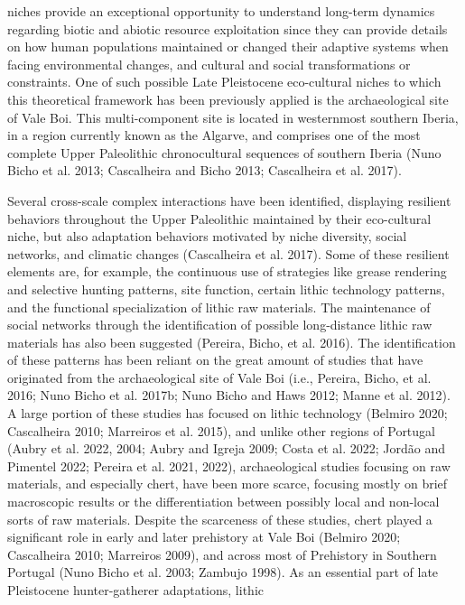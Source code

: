 \documentclass[
  a4paper,
  DIV=11,
  numbers=noendperiod]{scrreprt}
\begin{document}
niches provide an exceptional opportunity to understand long-term
dynamics regarding biotic and abiotic resource exploitation since they
can provide details on how human populations maintained or changed their
adaptive systems when facing environmental changes, and cultural and
social transformations or constraints. One of such possible Late
Pleistocene eco-cultural niches to which this theoretical framework has
been previously applied is the archaeological site of Vale Boi. This
multi-component site is located in westernmost southern Iberia, in a
region currently known as the Algarve, and comprises one of the most
complete Upper Paleolithic chronocultural sequences of southern Iberia
(Nuno Bicho et al. 2013; Cascalheira and Bicho 2013; Cascalheira et al.
2017).

Several cross-scale complex interactions have been identified,
displaying resilient behaviors throughout the Upper Paleolithic
maintained by their eco-cultural niche, but also adaptation behaviors
motivated by niche diversity, social networks, and climatic changes
(Cascalheira et al. 2017). Some of these resilient elements are, for
example, the continuous use of strategies like grease rendering and
selective hunting patterns, site function, certain lithic technology
patterns, and the functional specialization of lithic raw materials. The
maintenance of social networks through the identification of possible
long-distance lithic raw materials has also been suggested (Pereira,
Bicho, et al. 2016). The identification of these patterns has been
reliant on the great amount of studies that have originated from the
archaeological site of Vale Boi (i.e., Pereira, Bicho, et al. 2016; Nuno
Bicho et al. 2017b; Nuno Bicho and Haws 2012; Manne et al. 2012). A
large portion of these studies has focused on lithic technology (Belmiro
2020; Cascalheira 2010; Marreiros et al. 2015), and unlike other regions
of Portugal (Aubry et al. 2022, 2004; Aubry and Igreja 2009; Costa et
al. 2022; Jordão and Pimentel 2022; Pereira et al. 2021, 2022),
archaeological studies focusing on raw materials, and especially chert,
have been more scarce, focusing mostly on brief macroscopic results or
the differentiation between possibly local and non-local sorts of raw
materials. Despite the scarceness of these studies, chert played a
significant role in early and later prehistory at Vale Boi (Belmiro
2020; Cascalheira 2010; Marreiros 2009), and across most of Prehistory
in Southern Portugal (Nuno Bicho et al. 2003; Zambujo 1998). As an
essential part of late Pleistocene hunter-gatherer adaptations, lithic
\end{document}
